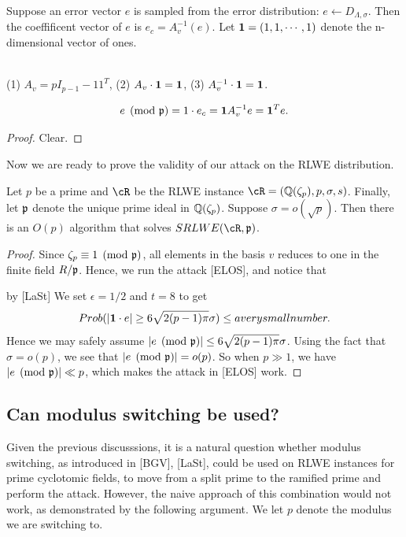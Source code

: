 \documentclass{amsart}
\begin{document}
Suppose an error vector $e$ is sampled from the error distribution: $e \gets D_{\Lambda, \sigma}$.  Then the coeffificent vector of $e$ is $e_c = A_v^{-1}(e)$.
Let ${\bf 1} = (1,1, \cdots,1)$ denote the n-dimensional vector of ones.

\begin{Lemma} \qquad \\
(1) $A_v = pI_{p-1} - 11^T$,
(2) $A_v \cdot {\bf 1} = {\bf 1}$,
(3) $A_v^{-1} \cdot {\bf 1} = {\bf 1}$.
\end{Lemma}

\begin{Lemma}
\[
e\pmod{\mathfrak{p}} = 1 \cdot e_c = {\bf 1} A_v^{-1} e = {\bf 1}^T e.
\]
\end{Lemma}
\begin{proof}
Clear.
\end{proof}

Now we are ready to prove the validity of our attack on the
RLWE distribution.
\begin{theorem}
Let $p$ be a prime and $\cR$ be the RLWE instance $\cR = (\bQ(\zeta_p), p,\sigma,s)$. Finally, let $\mathfrak{p}$ denote the unique prime ideal in $\mathbb{Q}(\zeta_p)$. Suppose $\sigma = o(\sqrt{p})$. Then there is an $O(p)$ algorithm that solves $SRLWE(\cR,\fp)$.
\end{theorem}

\begin{proof}
Since $\zeta_p \equiv 1 \pmod{\mathfrak{p}}$, all elements in the basis $v$ reduces to one in the finite field $R/\mathfrak{p}$. Hence, we run the attack [ELOS], and notice that

by [LaSt] We set $\epsilon = 1/2$ and $t  = 8$ to get
\[
Prob(|{\bf 1} \cdot e| \geq 6\sqrt{2(p-1)\pi} \sigma) \leq a very small number.
\]
Hence we may safely assume
$|e \pmod{\mathfrak{p}}|\leq 6\sqrt{2(p-1)\pi} \sigma$. Using the fact that $\sigma = o(p)$, we see that $|e \pmod{\mathfrak{p}}| = o(p)$. So when $p \gg 1$, we have  $|e \pmod{\mathfrak{p}}| \ll p$, which makes the attack in [ELOS] work.
\end{proof}

\subsection{Can modulus switching be used?}

Given the previous discusssions, it is a natural question whether modulus switching, as introduced in [BGV], [LaSt],
could be used on RLWE instances for prime cyclotomic fields, to move from a split prime to the ramified prime and perform the attack. However, the naive approach of this combination would not work, as demonstrated by the following argument.
We let $p$ denote the modulus we are switching to. 
\end{document}
